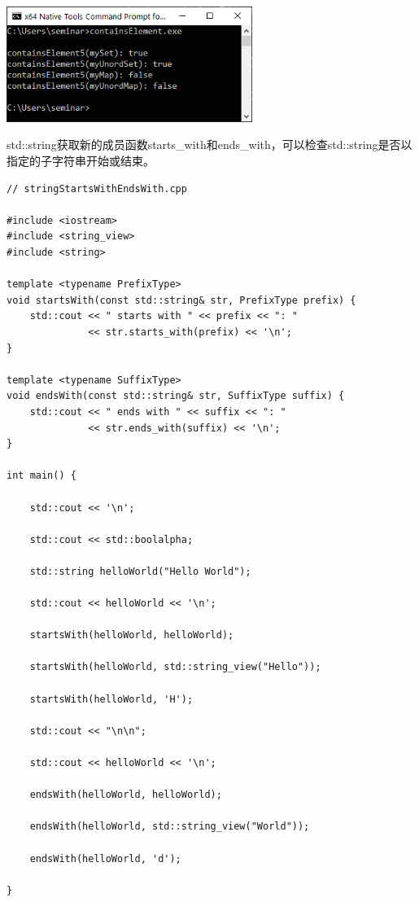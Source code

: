 \begin{center}
\includegraphics[width=0.6\textwidth]{content/3/chapter5/images/14.png}\\
\end{center}


std::string获取新的成员函数starts\_with和ends\_with，可以检查std::string是否以指定的子字符串开始或结束。

\begin{lstlisting}[style=styleCXX]
// stringStartsWithEndsWith.cpp

#include <iostream>
#include <string_view>
#include <string>

template <typename PrefixType>
void startsWith(const std::string& str, PrefixType prefix) {
	std::cout << " starts with " << prefix << ": "
			  << str.starts_with(prefix) << '\n';
}

template <typename SuffixType>
void endsWith(const std::string& str, SuffixType suffix) {
	std::cout << " ends with " << suffix << ": "
			  << str.ends_with(suffix) << '\n';
}

int main() {

	std::cout << '\n';
	
	std::cout << std::boolalpha;
	
	std::string helloWorld("Hello World");
	
	std::cout << helloWorld << '\n';
	
	startsWith(helloWorld, helloWorld);
	
	startsWith(helloWorld, std::string_view("Hello"));
	
	startsWith(helloWorld, 'H');
	
	std::cout << "\n\n";
	
	std::cout << helloWorld << '\n';
	
	endsWith(helloWorld, helloWorld);
	
	endsWith(helloWorld, std::string_view("World"));
	
	endsWith(helloWorld, 'd');

}
\end{lstlisting}

